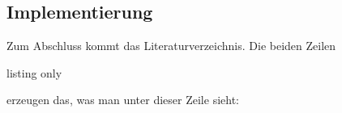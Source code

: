 \subsection{Implementierung}




\label{sec:summary}

Zum Abschluss kommt das Literaturverzeichnis.
%
Die beiden Zeilen

\begin{tcblisting}{listing only}
  
  
\end{tcblisting}

erzeugen das, was man unter dieser Zeile sieht:





